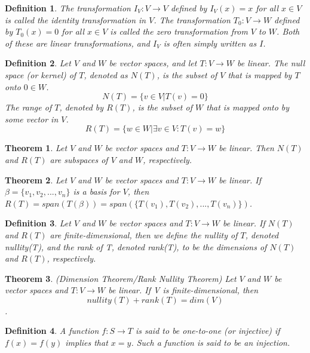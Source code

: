 \documentclass[a4paper]{article}
\newtheorem{mytheorem}{Theorem}
\newtheorem{mydef}{Definition}
\numberwithin{mytheorem}{section}
\numberwithin{mydef}{section}
\numberwithin{example}{section}
\begin{document}
\begin{mydef} The transformation $I_{V}: V \rightarrow V$ defined by $I_{V}(x) = x$ for all $x \in V$ is called the identity transformation in $V$. The transformation $T_{0}: V \rightarrow W$ defined by $T_{0}(x) = 0$ for all $x \in V$ is called the zero transformation from $V$ to $W$. Both of these are linear transformations, and $I_{V}$ is often simply written as $I$.
\end{mydef}

\begin{mydef} Let $V$ and $W$ be vector spaces, and let $T: V \rightarrow W$ be linear. The null space (or kernel) of $T$, denoted as $N(T)$, is the subset of $V$ that is mapped by $T$ onto $0 \in W$. 
$$ N(T) = \{ v \in V | T(v) = 0 \} $$
The range of $T$, denoted by $R(T)$, is the subset of $W$ that is mapped onto by some vector in $V$. 
$$ R(T) = \{ w \in W | \exists v \in V : T(v) = w \} $$
\end{mydef}

\begin{mytheorem} Let $V$ and $W$ be vector spaces and $T: V \rightarrow W$ be linear. Then $N(T)$ and $R(T)$ are subspaces of $V$ and $W$, respectively.
\end{mytheorem}

\begin{mytheorem} Let $V$ and $W$ be vector spaces and $T: V \rightarrow W$ be linear. If $\beta = \{v_{1},v_{2},...,v_{n} \}$ is a basis for $V$, then $R(T) = span(T(\beta)) = span(\{ T(v_{1}),T(v_{2}),...,T(v_{n}) \} )$.
\end{mytheorem}

\begin{mydef}  Let $V$ and $W$ be vector spaces and $T: V \rightarrow W$ be linear. If $N(T)$ and $R(T)$ are finite-dimensional, then we define the nullity of $T$, denoted nullity(T), and the rank of T, denoted rank(T), to be the dimensions of $N(T)$ and $R(T)$, respectively.
\end{mydef}

\begin{mytheorem} (Dimension Theorem/Rank Nullity Theorem) Let $V$ and $W$ be vector spaces and $T: V \rightarrow W$ be linear. If V is finite-dimensional, then $$ nullity(T) + rank(T) = dim(V) $$.
\end{mytheorem}

\begin{mydef}  A function $f : S \rightarrow T$ is said to be one-to-one (or injective) if $f(x) = f(y)$ implies that $x = y$. Such a function is said to be an injection.
\end{mydef}
\end{document}
